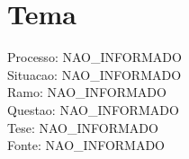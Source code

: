 \documentclass[12pt]{article}
\begin{document}
\section*{Tema }
Processo: NAO\_INFORMADO\\
Situacao: NAO\_INFORMADO\\
Ramo: NAO\_INFORMADO\\
Questao: NAO\_INFORMADO\\
Tese: NAO\_INFORMADO\\
Fonte: NAO\_INFORMADO
\end{document}
